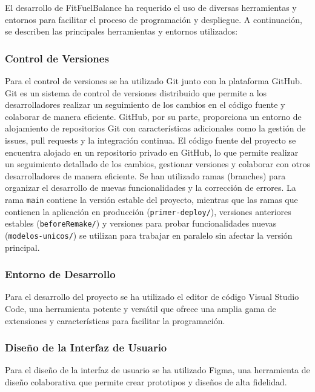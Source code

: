 El desarrollo de FitFuelBalance ha requerido el uso de diversas herramientas y entornos para facilitar el proceso de programación y despliegue. A continuación, se describen las principales herramientas y entornos utilizados:

\subsubsection{Control de Versiones}

Para el control de versiones se ha utilizado Git junto con la plataforma GitHub. Git es un sistema de control de versiones distribuido que permite a los desarrolladores realizar un seguimiento de los cambios en el código fuente y colaborar de manera eficiente. GitHub, por su parte, proporciona un entorno de alojamiento de repositorios Git con características adicionales como la gestión de issues, pull requests y la integración continua. El código fuente del proyecto se encuentra alojado en un repositorio privado en GitHub, lo que permite realizar un seguimiento detallado de los cambios, gestionar versiones y colaborar con otros desarrolladores de manera eficiente. Se han utilizado ramas (branches) para organizar el desarrollo de nuevas funcionalidades y la corrección de errores. La rama \texttt{main} contiene la versión estable del proyecto, mientras que las ramas que contienen la aplicación en producción (\texttt{primer-deploy/}), versiones anteriores estables (\texttt{beforeRemake/}) y versiones para probar funcionalidades nuevas (\texttt{modelos-unicos/}) se utilizan para trabajar en paralelo sin afectar la versión principal.

\subsubsection{Entorno de Desarrollo}

Para el desarrollo del proyecto se ha utilizado el editor de código Visual Studio Code, una herramienta potente y versátil que ofrece una amplia gama de extensiones y características para facilitar la programación.

\subsubsection{Diseño de la Interfaz de Usuario}

Para el diseño de la interfaz de usuario se ha utilizado Figma, una herramienta de diseño colaborativa que permite crear prototipos y diseños de alta fidelidad.

